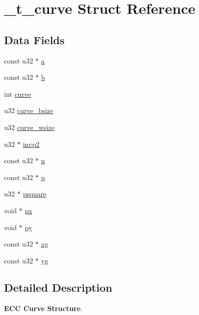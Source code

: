 \hypertarget{struct__t__curve}{\section{\+\_\+t\+\_\+curve Struct Reference}
\label{struct__t__curve}
}
\subsection*{Data Fields}
\begin{DoxyCompactItemize}
\item 
const u32 $\ast$ \hyperlink{struct__t__curve_a88955062c39051a3125096467bc4ab29}{a}
\item 
const u32 $\ast$ \hyperlink{struct__t__curve_a8b6702ad371684048f47db647567c59f}{b}
\item 
int \hyperlink{struct__t__curve_ad61e4ff482e52b3da8c2f5e13dc3c73d}{curve}
\item 
u32 \hyperlink{struct__t__curve_a9bbec58f3c4e0242f4a35e5a074e8157}{curve\+\_\+bsize}
\item 
u32 \hyperlink{struct__t__curve_a197249f7a6676b30ff0a587d2840d6bb}{curve\+\_\+wsize}
\item 
u32 $\ast$ \hyperlink{struct__t__curve_af069f02c44aabbf48a58630e66a45881}{invp2}
\item 
const u32 $\ast$ \hyperlink{struct__t__curve_a47b7adf4fa2a08459833020659e6a504}{n}
\item 
const u32 $\ast$ \hyperlink{struct__t__curve_ad19e9ad5fa75d3a5f3e691c3ed9627b5}{p}
\item 
u32 $\ast$ \hyperlink{struct__t__curve_adb489f0d60e4689407b67e1b45cb1848}{psquare}
\item 
void $\ast$ \hyperlink{struct__t__curve_affdf78baef4434da522f1b63632bd17e}{px}
\item 
void $\ast$ \hyperlink{struct__t__curve_aed69d60ec1a2d98bd79d9d35386558eb}{py}
\item 
const u32 $\ast$ \hyperlink{struct__t__curve_ac386d0e2f79d9a0298b32b5f401a4215}{xg}
\item 
const u32 $\ast$ \hyperlink{struct__t__curve_aefd5cee3d48669caaf076f0c596ba644}{yg}
\end{DoxyCompactItemize}


\subsection{Detailed Description}
{\bfseries E\+C\+C Curve Structure}. 

